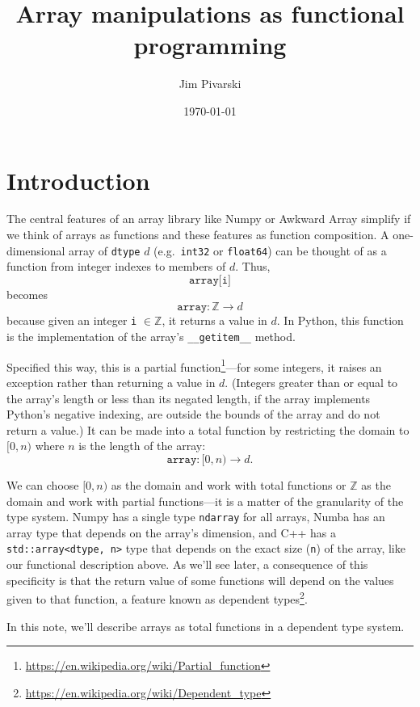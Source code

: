 \documentclass[12pt]{article}
\title{Array manipulations as functional programming}
\author{Jim Pivarski}
\date{\today}
\begin{document}
\maketitle

\setlength{\parskip}{0.5\baselineskip}

\section*{Introduction}

The central features of an array library like Numpy or Awkward Array simplify if we think of arrays as functions and these features as function composition. A one-dimensional array of \texttt{dtype} $d$ (e.g.\ \texttt{int32} or \texttt{float64}) can be thought of as a function from integer indexes to members of $d$. Thus,
\[ \texttt{array[i]} \]
\noindent becomes
\[ \texttt{array}: \mathbb{Z} \to d \]
\noindent because given an integer \texttt{i} $\in \mathbb{Z}$, it returns a value in $d$.  In Python, this function is the implementation of the array's \texttt{__getitem__} method.

Specified this way, this is a partial function\footnote{\url{https://en.wikipedia.org/wiki/Partial_function}}---for some integers, it raises an exception rather than returning a value in $d$. (Integers greater than or equal to the array's length or less than its negated length, if the array implements Python's negative indexing, are outside the bounds of the array and do not return a value.) It can be made into a total function by restricting the domain to $[0, n)$ where $n$ is the length of the array:
\[ \texttt{array}: [0, n) \to d. \]

We can choose $[0, n)$ as the domain and work with total functions or $\mathbb{Z}$ as the domain and work with partial functions---it is a matter of the granularity of the type system. Numpy has a single type \texttt{ndarray} for all arrays, Numba has an array type that depends on the array's dimension, and C++ has a \texttt{std::array<dtype, n>} type that depends on the exact size (\texttt{n}) of the array, like our functional description above. As we'll see later, a consequence of this specificity is that the return value of some functions will depend on the values given to that function, a feature known as dependent types\footnote{\url{https://en.wikipedia.org/wiki/Dependent_type}}.

In this note, we'll describe arrays as total functions in a dependent type system.
\end{document}
